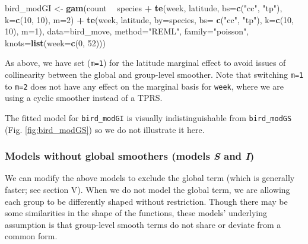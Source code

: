 \documentclass[12pt]{article}
\newenvironment{Shaded}{\begin{snugshade}}{\end{snugshade}}
\newcommand{\KeywordTok}[1]{\textcolor[rgb]{0.13,0.29,0.53}{\textbf{#1}}}
\newcommand{\DataTypeTok}[1]{\textcolor[rgb]{0.13,0.29,0.53}{#1}}
\newcommand{\DecValTok}[1]{\textcolor[rgb]{0.00,0.00,0.81}{#1}}
\newcommand{\StringTok}[1]{\textcolor[rgb]{0.31,0.60,0.02}{#1}}
\newcommand{\OperatorTok}[1]{\textcolor[rgb]{0.81,0.36,0.00}{\textbf{#1}}}
\newcommand{\NormalTok}[1]{#1}
\begin{document}
\begin{Shaded}
\begin{Highlighting}[]
\NormalTok{bird_modGI <-}\StringTok{ }\KeywordTok{gam}\NormalTok{(count }\OperatorTok{~}\StringTok{ }\NormalTok{species }\OperatorTok{+}
\StringTok{                    }\KeywordTok{te}\NormalTok{(week, latitude, }\DataTypeTok{bs=}\KeywordTok{c}\NormalTok{(}\StringTok{"cc"}\NormalTok{, }\StringTok{"tp"}\NormalTok{), }\DataTypeTok{k=}\KeywordTok{c}\NormalTok{(}\DecValTok{10}\NormalTok{, }\DecValTok{10}\NormalTok{), }\DataTypeTok{m=}\DecValTok{2}\NormalTok{) }\OperatorTok{+}
\StringTok{                    }\KeywordTok{te}\NormalTok{(week, latitude, }\DataTypeTok{by=}\NormalTok{species, }\DataTypeTok{bs=} \KeywordTok{c}\NormalTok{(}\StringTok{"cc"}\NormalTok{, }\StringTok{"tp"}\NormalTok{),}
                       \DataTypeTok{k=}\KeywordTok{c}\NormalTok{(}\DecValTok{10}\NormalTok{, }\DecValTok{10}\NormalTok{), }\DataTypeTok{m=}\DecValTok{1}\NormalTok{),}
                 \DataTypeTok{data=}\NormalTok{bird_move, }\DataTypeTok{method=}\StringTok{"REML"}\NormalTok{, }\DataTypeTok{family=}\StringTok{"poisson"}\NormalTok{,}
                 \DataTypeTok{knots=}\KeywordTok{list}\NormalTok{(}\DataTypeTok{week=}\KeywordTok{c}\NormalTok{(}\DecValTok{0}\NormalTok{, }\DecValTok{52}\NormalTok{)))}
\end{Highlighting}
\end{Shaded}

As above, we have set (\texttt{m=1}) for the latitude marginal effect to
avoid issues of collinearity between the global and group-level
smoother. Note that switching \texttt{m=1} to \texttt{m=2} does not have
any effect on the marginal basis for \texttt{week}, where we are using a
cyclic smoother instead of a TPRS.

The fitted model for \texttt{bird\_modGI} is visually indistinguishable
from \texttt{bird\_modGS} (Fig. \ref{fig:bird_modGS}) so we do not
illustrate it here.

\subsubsection{\texorpdfstring{Models without global smoothers (models
\emph{S} and
\emph{I})}{Models without global smoothers (models S and I)}}\label{models-without-global-smoothers-models-s-and-i}

We can modify the above models to exclude the global term (which is
generally faster; see section V). When we do not model the global term,
we are allowing each group to be differently shaped without restriction.
Though there may be some similarities in the shape of the functions,
these models' underlying assumption is that group-level smooth terms do
not share or deviate from a common form.
\end{document}
